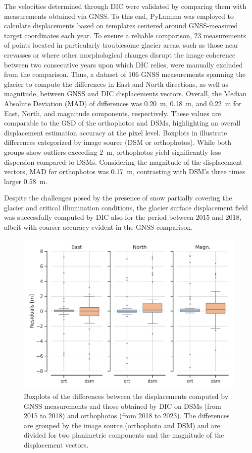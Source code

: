 The velocities determined through DIC were validated by comparing them with measurements obtained via GNSS.
To this end, PyLamma was employed to calculate displacements based on templates centered around GNSS-measured target coordinates each year. 
To ensure a reliable comparison, 23 measurements of points located in particularly troublesome glacier areas, such as those near crevasses or where other morphological changes disrupt the image coherence between two consecutive years upon which DIC relies, were manually excluded from the comparison.
Thus, a dataset of 106 GNSS measurements spanning the glacier to compute the differences in East and North directions, as well as magnitude, between GNSS and DIC displacements vectors.
Overall, the Median Absolute Deviation (MAD) of differences was \SI{0.20}{\meter}, \SI{0.18}{\meter}, and \SI{0.22}{\meter} for East, North, and magnitude components, respectively.
These values are comparable to the GSD of the orthophotos and DSMs, highlighting an overall displacement estimation accuracy at the pixel level.
Boxplots in  illustrate differences categorized by image source (DSM or orthophotos). 
While both groups show outliers exceeding \SI{2}{\meter}, orthophotos yield significantly less dispersion compared to DSMs.
Considering the magnitude of the displacement vectors, MAD for orthophotos was \SI{0.17}{\meter}, contrasting with DSM's three times larger \SI{0.58}{\meter}. 

Despite the challenges posed by the presence of snow partially covering the glacier and critical illumination conditions, the glacier surface displacement field was successfully computed by DIC also for the period between 2015 and 2018, albeit with coarser accuracy evident in the GNSS comparison.

\begin{figure}[ht]
    \centering
    \includegraphics[width=0.8\columnwidth]{gps_lamma_boxplot.png}
    \caption{Boxplots of the differences between the displacements computed by GNSS measurements and those obtained by DIC on DSMs (from 2015 to 2018) and orthophotos (from 2018 to 2023). The differences are grouped by the image source (orthophoto and DSM) and are divided for two planimetric components and the magnitude of the displacement vectors.}
    \label{fig:3:gps_lamma_boxplot}
\end{figure}

